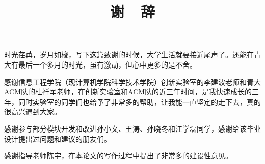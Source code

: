 \begin{center}
\title{谢~~辞}
\date{}
\maketitle
\end{center}

时光荏苒，岁月如梭，写下这篇致谢的时候，大学生活就要接近尾声了。还能在青大有最后一个多月的时光，虽有激动，但心中更多的是不舍。

感谢信息工程学院（现计算机学院科学技术学院）创新实验室的李建波老师和青大ACM队的杜祥军老师，在创新实验室和ACM队的近三年时间，是我快速成长的三年，同时实验室的同学们也给予了非常多的帮助，让我能一直坚定的走下去，真的很高兴遇到大家。

感谢参与部分模块开发和改进孙小文、王涛、孙晓冬和江学磊同学，感谢给该毕业设计提出过问题和建议的朋友们。

感谢指导老师陈宇，在本论文的写作过程中提出了非常多的建设性意见。

